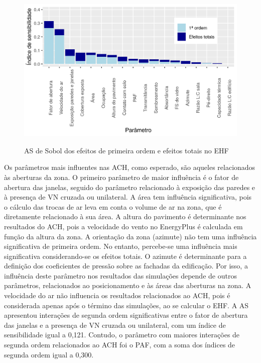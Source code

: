 \documentclass[brazil,hardcopy,openany,a4paper]{ufscthesis}
\begin{document}
	\begin{figure}[H]
		\centering
		\caption{AS de Sobol dos efeitos de primeira ordem e efeitos totais no EHF}
		\includegraphics[width=1\linewidth]{img/as_ehf.png}
		\label{fig:as_ehf}
	\end{figure}

	Os parâmetros mais influentes nas ACH, como esperado, são aqueles relacionados às aberturas da zona. 
	O primeiro parâmetro de maior influência é o fator de abertura das janelas, seguido do parâmetro relacionado à exposição das paredes e à presença de VN cruzada ou unilateral. A área tem influência significativa, pois o cálculo das trocas de ar leva em conta o volume de ar na zona, que é diretamente relacionado à sua área. 
	A altura do pavimento é determinante nos resultados do ACH, pois a velocidade do vento no EnergyPlus é calculada em função da altura da zona.
	A orientação da zona (azimute) não tem uma influência significativa de primeira ordem. No entanto, percebe-se uma influência mais significativa considerando-se os efeitos totais. 
	O azimute é determinante para a definição dos coeficientes de pressão sobre as fachadas da edificação. Por isso, a influência deste parâmetro nos resultados das simulações depende de outros parâmetros, relacionados ao posicionamento e às áreas das aberturas na zona.
	A velocidade do ar não influencia os resultados relacionados ao ACH, pois é considerada apenas após o término das simulações, ao se calcular o EHF.
	A AS apresentou interações de segunda ordem significativas entre o fator de abertura das janelas e a presença de VN cruzada ou unilateral, com um índice de sensibilidade igual a 0,121.
	Contudo, o parâmetro com maiores interações de segunda ordem relacionados ao ACH foi o PAF, com a soma dos índices de segunda ordem igual a 0,300.
	
\end{document}
